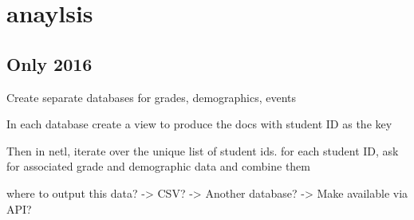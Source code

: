 \section{anaylsis}

\subsection{Only 2016}

Create separate databases for grades, demographics, events

In each database create a view to produce the docs with student ID as the key

Then in netl, iterate over the unique list of student ids. for each student ID, ask for associated grade and demographic data and combine them

where to output this data?
-> CSV?
-> Another database?
-> Make available via API?


